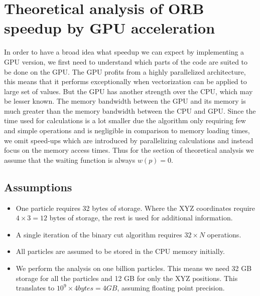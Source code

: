 \documentclass[]{article}
\begin{document}
\vspace{5mm}


\section{Theoretical analysis of ORB speedup by GPU acceleration}

In order to have a broad idea what speedup we can expect by implementing a GPU version, we first need to understand which parts of the code are suited to be done on the GPU. The GPU profits from a highly parallelized architecture, this means that it performs exceptionally when vectorization can be applied to large set of values. But the GPU has another strength over the CPU, which may be lesser known. The memory bandwidth between the GPU and its memory is much greater than the memory bandwidth between the CPU and GPU. Since the time used for calculations is a lot smaller due the algorithm only requiring few and simple operations and is negligible in comparison to memory loading times, we omit speed-ups which are introduced by parallelizing calculations and instead focus on the memory access times. Thus for the section of theoretical analysis we assume that the waiting function is always $w(p) = 0$.




\subsection{Assumptions} 
\begin{itemize}
	\item 
	One particle requires 32 bytes of storage. Where the XYZ coordinates require $4\times3 = 12$ bytes of storage, the rest is used for additional information.
	
	\item
	A single iteration of the binary cut algorithm requires $32 \times N$ operations.
	
	\item 
	All particles are assumed to be stored in the CPU memory initially.
	
	\item
	We perform the analysis on one billion particles. This means we need 32 GB storage for all the particles and 12 GB for only the XYZ positions. This translates to $10^9 \times 4 bytes = 4 GB$, assuming floating point precision. 

\end{itemize}
\end{document}
